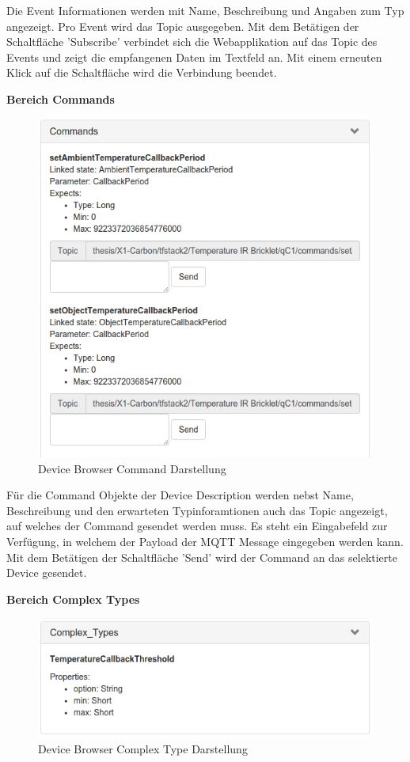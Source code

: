 {Die Event Informationen werden mit Name, Beschreibung und Angaben zum Typ angezeigt. Pro Event wird das Topic ausgegeben. Mit dem Betätigen der Schaltfläche 'Subscribe' verbindet sich die Webapplikation auf das Topic des Events und zeigt die empfangenen Daten im Textfeld an. Mit einem erneuten Klick auf die Schaltfläche wird die Verbindung beendet.

\newpage
\textbf{Bereich Commands}

\begin{figure}[H]
	\centering
        \includegraphics[width=0.7\linewidth]{bilder/device_browser_commands.png} 
    \caption{Device Browser Command Darstellung}
\end{figure}

Für die Command Objekte der Device Description werden nebst Name, Beschreibung und den erwarteten Typinforamtionen auch das Topic angezeigt, auf welches der Command gesendet werden muss. Es steht ein Eingabefeld zur Verfügung, in welchem der Payload der MQTT Message eingegeben werden kann. Mit dem Betätigen der Schaltfläche 'Send' wird der Command an das selektierte Device gesendet.


\textbf{Bereich Complex Types} \\
\begin{figure}[H]
	\centering
        \includegraphics[width=0.7\linewidth]{bilder/device_browser_comptypes.png} 
    \caption{Device Browser Complex Type Darstellung}
\end{figure}

}
